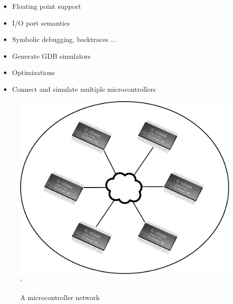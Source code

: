 \begin{block}{\large {}\vphantom{Future Work}}
    \begin{itemize}
        \item Floating point support
        \item I/O port semantics
        \item Symbolic debugging, backtraces ...
        \item Generate GDB simulators
        \item Optimizations
	\item Connect and simulate multiple microcontrollers
    \end{itemize}
	\begin{figure}
		\includegraphics[width=\linewidth]{figures/netwerk.png}`
		\caption{A microcontroller network}
	\end{figure}
\end{block}

